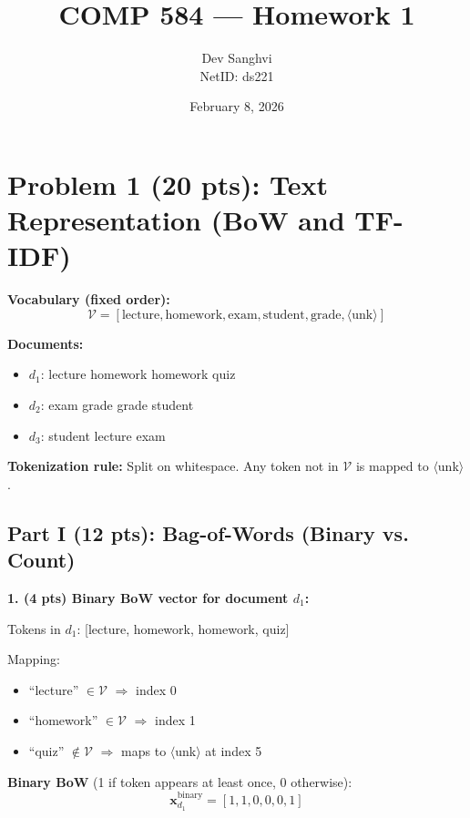 \documentclass[11pt]{article}
\title{COMP 584 --- Homework 1}
\author{Dev Sanghvi \\ NetID: ds221}
\date{February 8, 2026}
\begin{document}
\maketitle

\section*{Problem 1 (20 pts): Text Representation (BoW and TF-IDF)}

\textbf{Vocabulary (fixed order):}
\[
\mathcal{V} = [\text{lecture}, \text{homework}, \text{exam}, \text{student}, \text{grade}, \langle\text{unk}\rangle]
\]

\textbf{Documents:}
\begin{itemize}[nosep]
    \item $d_1$: lecture homework homework quiz
    \item $d_2$: exam grade grade student
    \item $d_3$: student lecture exam
\end{itemize}

\textbf{Tokenization rule:} Split on whitespace. Any token not in $\mathcal{V}$ is mapped to $\langle$unk$\rangle$.

\subsection*{Part I (12 pts): Bag-of-Words (Binary vs. Count)}

\textbf{1. (4 pts) Binary BoW vector for document $d_1$:}

Tokens in $d_1$: [lecture, homework, homework, quiz]

Mapping:
\begin{itemize}[nosep]
    \item ``lecture'' $\in \mathcal{V}$ $\Rightarrow$ index 0
    \item ``homework'' $\in \mathcal{V}$ $\Rightarrow$ index 1
    \item ``quiz'' $\notin \mathcal{V}$ $\Rightarrow$ maps to $\langle$unk$\rangle$ at index 5
\end{itemize}

\textbf{Binary BoW} (1 if token appears at least once, 0 otherwise):
\[
\boxed{\mathbf{x}_{d_1}^{\text{binary}} = [1, 1, 0, 0, 0, 1]}
\]
\end{document}
